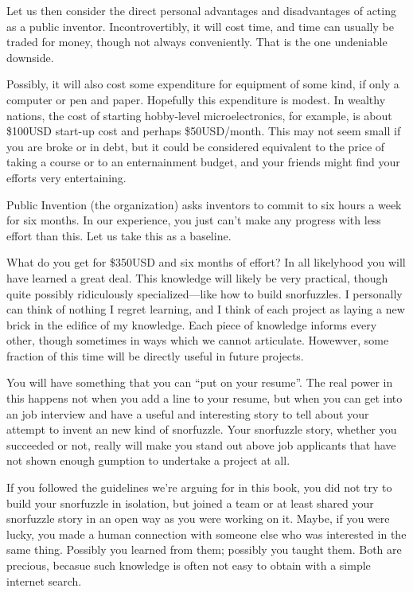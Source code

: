 \documentclass[
	fontsize=10pt, %
	twoside=false, %
	secnumdepth=1, %
]{kaobook}
\begin{document}
Let us then consider the direct personal advantages and disadvantages of
acting as a public inventor. Incontrovertibly, it will cost
time, and time can usually be traded for money, though not
always conveniently. That is the one undeniable downside.

Possibly, it will also cost some expenditure for equipment of
some kind, if only a computer or pen and paper.
Hopefully this expenditure is modest. In wealthy nations,
the cost of starting hobby-level microelectronics, for example,
is about \$100USD start-up cost and perhaps \$50USD/month.
This may not seem small if you are broke or in debt, but
it could be considered equivalent to the price of taking a course or to an enternainment
budget, and your friends might find your efforts very entertaining.

Public Invention (the organization) asks inventors to commit to six hours
a week for six months. In our experience, you just can't make any
progress with less effort than this. Let us take this as a baseline.

What do you get for \$350USD and six months of effort?
In all likelyhood you will have learned a great deal.
This knowledge will likely be very practical, though
quite possibly ridiculously specialized---like how to build snorfuzzles.
I personally can think of nothing I regret learning, and
I think of each project as laying a new brick in the
edifice of my knowledge. Each piece of knowledge
informs every other, though sometimes in ways which
we cannot articulate.
Howewver, some fraction of this time will be directly useful in future projects.

You will have something that you can ``put on your resume''.
The real power in this happens not when you add a line to your resume,
but when you can get into an job interview and have a useful and
interesting story to tell about your attempt to invent an new kind
of snorfuzzle. Your snorfuzzle story, whether you succeeded or not,
really will make you stand out above job applicants that have not
shown enough gumption to undertake a project at all.

If you followed the guidelines we're
arguing for in this book, you did not try to build your snorfuzzle
in isolation, but joined a team or at least shared your snorfuzzle story
in an open way as you were working on it.
Maybe, if you were lucky,
you made a human connection with someone else who was interested in
the same thing.
Possibly you learned from them; possibly you taught them.
Both are precious, becasue such knowledge is often
not easy to obtain with a simple internet search.
\end{document}
